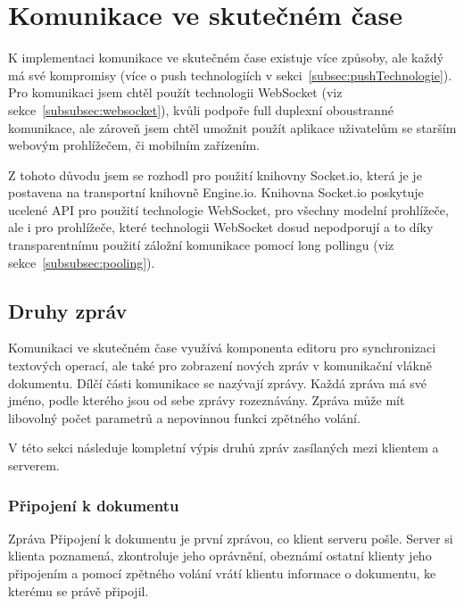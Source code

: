
\section{Komunikace ve skutečném čase}\label{sec:komunikaceVeSkutečnémČase}


K implementaci komunikace ve skutečném čase existuje více způsoby, ale každý má své kompromisy (více o push technologiích v sekci~\ref{subsec:pushTechnologie}).
Pro komunikaci jsem chtěl použít technologii WebSocket (viz sekce~\ref{subsubsec:websocket}), kvůli podpoře full duplexní oboustranné komunikace, ale zároveň jsem chtěl umožnit použít aplikace uživatelům se starším webovým prohlížečem, či mobilním zařízením.

Z tohoto důvodu jsem se rozhodl pro použití knihovny Socket.io, která je je postavena na transportní knihovně Engine.io.
Knihovna Socket.io poskytuje ucelené \gls{API} pro použití technologie WebSocket, pro všechny modelní prohlížeče, ale i pro prohlížeče, které technologii WebSocket dosud nepodporují a to díky transparentnímu použití záložní komunikace pomocí long pollingu (viz sekce~\ref{subsubsec:pooling}).

\subsection{Druhy zpráv}\label{subsec:druhyZprávyVeSkutečnémČase}

Komunikaci ve skutečném čase využívá komponenta editoru pro synchronizaci textových operací, ale také pro zobrazení nových zpráv v komunikační vlákně dokumentu.
Dílčí části komunikace se nazývají zprávy.
Každá zpráva má své jméno, podle kterého jsou od sebe zprávy rozeznávány.
Zpráva může mít libovolný počet parametrů a nepovinnou funkci zpětného volání.

V této sekci následuje kompletní výpis druhů zpráv zasílaných mezi klientem a serverem.

\subsubsection{Připojení k dokumentu} %

Zpráva Připojení k dokumentu je první zprávou, co klient serveru pošle.
Server si klienta poznamená, zkontroluje jeho oprávnění, obeznámí ostatní klienty jeho připojením a pomocí zpětného volání vrátí klientu informace o dokumentu, ke kterému se právě připojil.

